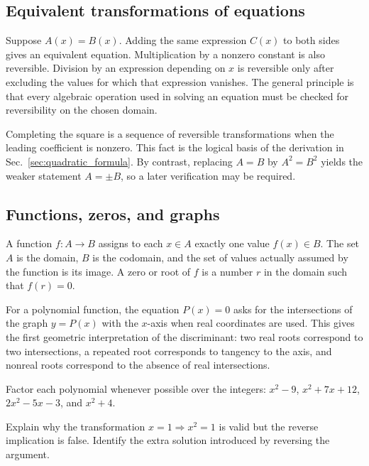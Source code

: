 \subsection{Equivalent transformations of equations}

Suppose $A(x)=B(x)$. Adding the same expression $C(x)$ to both sides gives an equivalent equation. Multiplication by a nonzero constant is also reversible. Division by an expression depending on $x$ is reversible only after excluding the values for which that expression vanishes. The general principle is that every algebraic operation used in solving an equation must be checked for reversibility on the chosen domain.

Completing the square is a sequence of reversible transformations when the leading coefficient is nonzero. This fact is the logical basis of the derivation in Sec.~\ref{sec:quadratic_formula}. By contrast, replacing $A=B$ by $A^2=B^2$ yields the weaker statement $A=\pm B$, so a later verification may be required.

\subsection{Functions, zeros, and graphs}

A function $f:A\to B$ assigns to each $x\in A$ exactly one value $f(x)\in B$. The set $A$ is the domain, $B$ is the codomain, and the set of values actually assumed by the function is its image. A zero or root of $f$ is a number $r$ in the domain such that $f(r)=0$.

For a polynomial function, the equation $P(x)=0$ asks for the intersections of the graph $y=P(x)$ with the $x$-axis when real coordinates are used. This gives the first geometric interpretation of the discriminant: two real roots correspond to two intersections, a repeated root corresponds to tangency to the axis, and nonreal roots correspond to the absence of real intersections.

\begin{exercise}
Factor each polynomial whenever possible over the integers: $x^2-9$, $x^2+7x+12$, $2x^2-5x-3$, and $x^2+4$.
\end{exercise}

\begin{exercise}
Explain why the transformation $x=1\Rightarrow x^2=1$ is valid but the reverse implication is false. Identify the extra solution introduced by reversing the argument.
\end{exercise}


